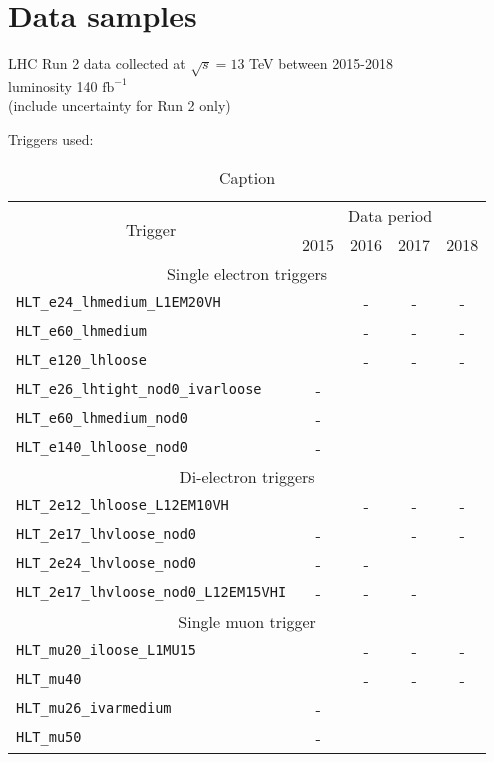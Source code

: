 \documentclass[../thesis.tex]{subfiles}
\begin{document}
\vspace{-1\baselineskip}

\section{Data samples}
\label{sec:data}
LHC Run 2 data collected at $\sqrt{s}=13$ TeV between 2015-2018\\
luminosity 140 $\text{fb}^{-1}$ \\
(include uncertainty for Run 2 only)

Triggers used:
\begin{table}[!ht]
\centering
\caption{\label{tab:ana:trigger}Caption}%
\begin{tabular}{p{9cm}|cccc}
\toprule\toprule
\multicolumn{1}{c|}{\multirow{ 2}{*}{Trigger}}	& \multicolumn{4}{c}{Data period} \\
\multicolumn{1}{c|}{}							& 2015	& 2016	& 2017	& 2018 \\
\midrule
\multicolumn{5}{c}{Single electron triggers} \\
\midrule
\verb|HLT_e24_lhmedium_L1EM20VH| 		& \checkmark & - & - & - \\
\verb|HLT_e60_lhmedium|					& \checkmark & - & - & - \\
\verb|HLT_e120_lhloose|					& \checkmark & - & - & - \\
\verb|HLT_e26_lhtight_nod0_ivarloose|	& - & \checkmark & \checkmark & \checkmark \\
\verb|HLT_e60_lhmedium_nod0|			& - & \checkmark & \checkmark & \checkmark \\
\verb|HLT_e140_lhloose_nod0|			& - & \checkmark & \checkmark & \checkmark \\
\midrule
\multicolumn{5}{c}{Di-electron triggers} \\
\midrule
\verb|HLT_2e12_lhloose_L12EM10VH |		& \checkmark & - & - & - \\
\verb|HLT_2e17_lhvloose_nod0| 			& - & \checkmark & - & - \\
\verb|HLT_2e24_lhvloose_nod0| 			& - & - & \checkmark & \checkmark \\
\verb|HLT_2e17_lhvloose_nod0_L12EM15VHI| 	& - & - & - & \checkmark \\
\midrule
\multicolumn{5}{c}{Single muon trigger} \\
\midrule
\verb|HLT_mu20_iloose_L1MU15| 			& \checkmark & - & - & - \\
\verb|HLT_mu40|							& \checkmark & - & - & - \\
\verb|HLT_mu26_ivarmedium| 				& - & \checkmark & \checkmark & \checkmark \\
\verb|HLT_mu50|							& - & \checkmark & \checkmark & \checkmark \\
\bottomrule\bottomrule
\end{tabular}
\end{table}
\end{document}
